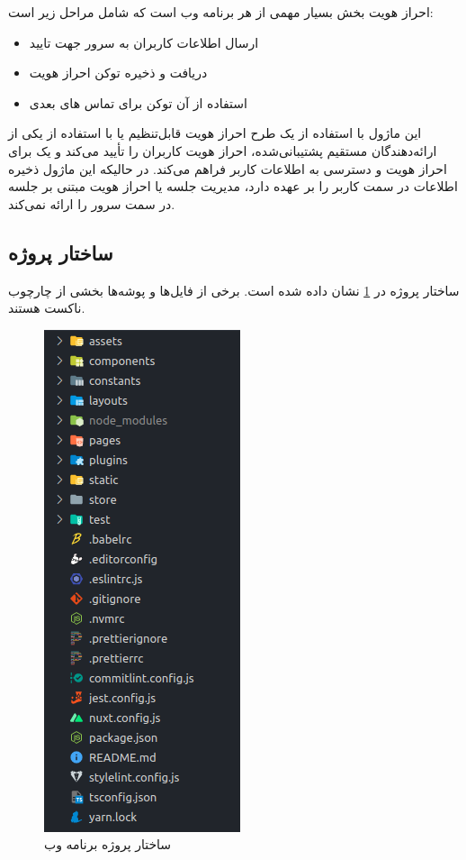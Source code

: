 احراز هویت بخش بسیار مهمی از هر برنامه وب است که شامل مراحل زیر است:

\begin{itemize}
\item ارسال اطلاعات کاربران به سرور جهت تایید
\item دریافت و ذخیره توکن احراز هویت
\item استفاده از آن توکن برای تماس های بعدی 
\end{itemize}

این ماژول با استفاده از یک طرح احراز هویت قابل‌تنظیم یا با استفاده از یکی از ارائه‌دهندگان مستقیم پشتیبانی‌شده، احراز هویت کاربران را تأیید می‌کند و یک  برای احراز هویت و دسترسی به اطلاعات کاربر فراهم می‌کند. در حالیکه این ماژول ذخیره اطلاعات در سمت کاربر را بر عهده دارد، مدیریت جلسه یا احراز هویت مبتنی بر جلسه در سمت سرور را ارائه نمی‌کند\cite{nuxt_auth}.

\subsection{ساختار پروژه}

ساختار پروژه در \cref{fig:front_structure} نشان داده شده است. برخی از فایل‌ها و پوشه‌ها بخشی از چارچوب ناکست هستند.

\begin{figure}[!h]
\centering\includegraphics[scale=.75]{front_structure.png}
\caption{ساختار پروژه برنامه وب}\label{fig:front_structure}
\end{figure}

